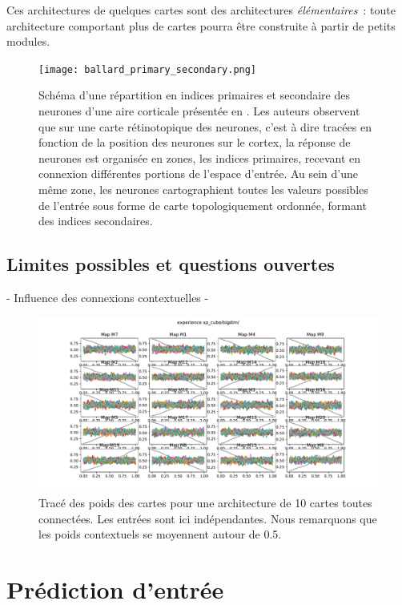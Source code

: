 \documentclass[../main]{subfiles}
\begin{document}
Ces architectures de quelques cartes sont des architectures \emph{élémentaires}~: toute architecture comportant plus de cartes pourra être construite à partir de petits modules.


\begin{figure}
	\centering\texttt{[image: ballard\_primary\_secondary.png]}
	\caption{Schéma d'une répartition en indices primaires et secondaire des neurones d'une aire corticale présentée en \cite{ballard_cortical_1986}. Les auteurs observent que sur une carte rétinotopique des neurones, c'est à dire tracées en fonction de la position des neurones sur le cortex, la réponse de neurones est organisée en zones, les indices primaires, recevant en connexion différentes portions de l'espace d'entrée. Au sein d'une même zone, les neurones cartographient toutes les valeurs possibles de l'entrée sous forme de carte topologiquement ordonnée, formant des indices secondaires.\label{fig:ballard}}
\end{figure}

\subsection{Limites possibles et questions ouvertes}

- Influence des connexions contextuelles 
- 

\begin{figure}
	\includegraphics[width=\textwidth]{xp_cube_bigdim.pdf}
	\caption{Tracé des poids des cartes pour une architecture de 10 cartes toutes connectées. Les entrées sont ici indépendantes. Nous remarquons que les poids contextuels se moyennent autour de 0.5.}
\end{figure}

\section{Prédiction d'entrée}
\end{document}
